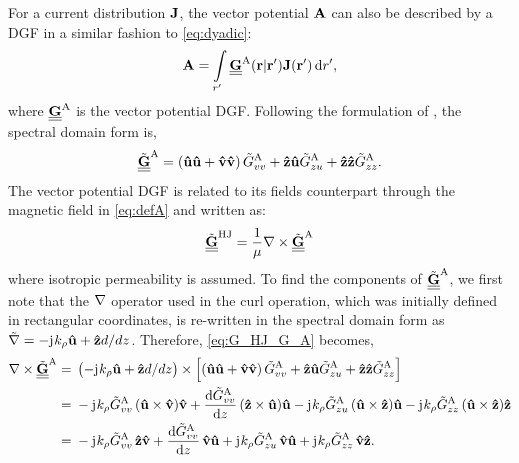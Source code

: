 \documentclass[12pt]{article}
\begin{document}
For a current distribution $\mathbf{J}$, the vector potential $\mathbf{A}$ can also be described by a DGF in a similar fashion to \eqref{eq:dyadic}:
%
\begin{equation}
\mathbf{A} = \int\limits_{r'} \underline{\underline{\mathbf{G}}}^\mathrm{A}(\mathbf{r} | \mathbf{r'}) \mathbf{J}(\mathbf{r'}) \mathop{}\!\mathrm{d}{r'},
\label{eq:G^A}
\end{equation}
%
where $\underline{\underline{\mathbf{G}}}^\mathrm{A}$ is the vector potential DGF. Following the formulation of \cite{Michalski1997}, the spectral domain form is,
%
\begin{equation}
  \underline{\underline{\tilde{\mathbf{G}}}}^\mathrm{A} = \left( \mathbf{\hat u} \mathbf{\hat u} + \mathbf{\hat v} \mathbf{\hat v} \right) \tilde{G}^\mathrm{A}_{vv} + \mathbf{\hat z} \mathbf{\hat u} \tilde{G}^\mathrm{A}_{zu} + \mathbf{\hat z} \mathbf{\hat z} \tilde{G}^\mathrm{A}_{zz}.
  \label{eq:G^A_general_form}
\end{equation}
%
The vector potential DGF is related to its fields counterpart through the magnetic field in \eqref{eq:defA} and written as:
%
\begin{equation}
  \underline{\underline{\tilde{\mathbf{G}}}}^\mathrm{HJ} = \frac{1}{\mu} \nabla \times \underline{\underline{\tilde{\mathbf{G}}}}^\mathrm{A}
  \label{eq:G_HJ_G_A}
\end{equation}
%
where isotropic permeability is assumed. To find the components of $\underline{\underline{\tilde{\mathbf{G}}}}^\mathrm{A}$, we first note that the $\nabla$ operator used in the curl operation, which was initially defined in rectangular coordinates, is re-written in the spectral domain form as $\tilde{\nabla} = -\mathrm{j}\mkern1mu k_{\rho} \mathbf{\hat u} + \mathbf{\hat z} d/{dz}$. Therefore, \eqref{eq:G_HJ_G_A} becomes,
%
\begin{equation}
  \begin{split}
    \nabla \times \underline{\underline{\tilde{\mathbf{G}}}}^\mathrm{A} ={}&  \left(-\mathrm{j}\mkern1mu k_{\rho} \mathbf{\hat u} + \mathbf{\hat z} d/{dz} \right) \times \left[ \left( \mathbf{\hat u} \mathbf{\hat u} + \mathbf{\hat v} \mathbf{\hat v} \right) \tilde{G}^\mathrm{A}_{vv} + \mathbf{\hat z} \mathbf{\hat u} \tilde{G}^\mathrm{A}_{zu} + \mathbf{\hat z} \mathbf{\hat z} \tilde{G}^\mathrm{A}_{zz} \right] \\
    ={}& -\mathrm{j}\mkern1mu k_{\rho} \tilde{G}^\mathrm{A}_{vv} \,(\mathbf{\hat u} \times \mathbf{\hat v})\mathbf{\hat v} + \dv{\tilde{G}^\mathrm{A}_{vv}}{z} \,(\mathbf{\hat z} \times \mathbf{\hat u})\mathbf{\hat u} - \mathrm{j}\mkern1mu k_{\rho} \tilde{G}^\mathrm{A}_{zu} \,(\mathbf{\hat u} \times \mathbf{\hat z})\mathbf{\hat u} - \mathrm{j}\mkern1mu k_{\rho} \tilde{G}^\mathrm{A}_{zz} \,(\mathbf{\hat u} \times \mathbf{\hat z})\mathbf{\hat z} \\
    ={}& -\mathrm{j}\mkern1mu k_{\rho} \tilde{G}^\mathrm{A}_{vv} \,\mathbf{\hat z}\mathbf{\hat v} + \dv{\tilde{G}^\mathrm{A}_{vv}}{z} \,\mathbf{\hat v}\mathbf{\hat u} + \mathrm{j}\mkern1mu k_{\rho} \tilde{G}^\mathrm{A}_{zu}\, \mathbf{\hat v}\mathbf{\hat u} + \mathrm{j}\mkern1mu k_{\rho} \tilde{G}^\mathrm{A}_{zz}\, \mathbf{\hat v}\mathbf{\hat z}.
  \end{split}
  \label{eq:curl_of_GA}
\end{equation}
\end{document}
